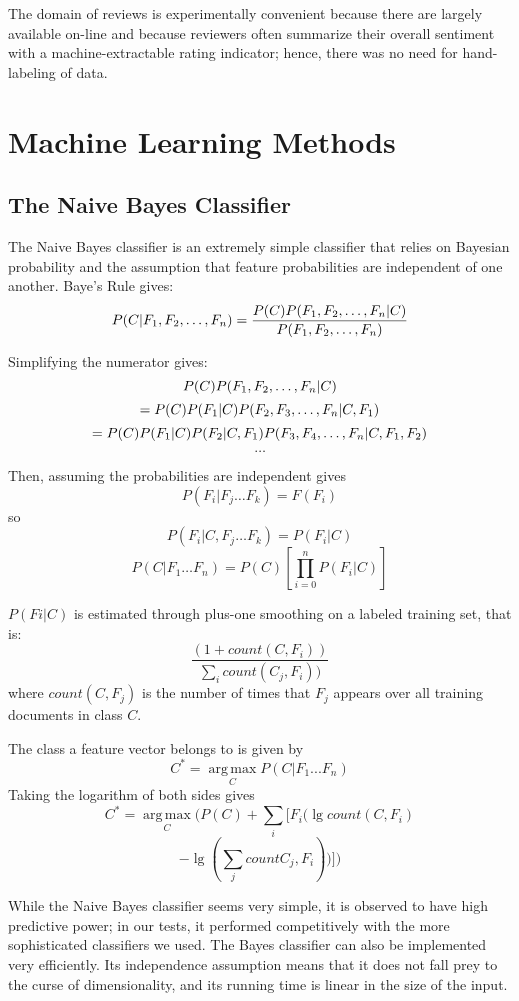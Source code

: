 \documentclass[10pt,twocolumn,letterpaper]{article}
\begin{document}
The domain of reviews is experimentally convenient because there are largely available on-line and because reviewers often summarize their overall sentiment with a machine-extractable rating indicator; hence, there was no need for hand-labeling of data.


\section{Machine Learning Methods}
\subsection{The Naive Bayes Classifier}
The Naive Bayes classifier\cite{Manning} is an extremely simple classifier that relies on Bayesian probability and the assumption that feature probabilities are independent of one another.
Baye's Rule gives:
$$
P(C | F_1, F_2, \ldots, F_n)
= \frac{P(C)P(F_1, F_2, \ldots, F_n | C)}{P(F_1, F_2, \ldots, F_n)} \\
$$

Simplifying the numerator gives:
$$P(C)P(F_1, F_2, \ldots, F_n | C)\\$$
$$= P(C)P(F_1 | C)P( F_2, F_3, \ldots, F_n| C, F_1) \\$$
$$= P(C)P(F_1 | C)P(F_2 | C, F_1)P(F_3, F_4, \ldots, F_n | C, F_1, F_2) \\$$
$$\ldots$$

Then, assuming the probabilities are independent gives
$$P(F_i | F_j\ldots F_k) = F(F_i)$$
so 
$$P(F_i | C, F_j\ldots F_k) = P(F_i | C)$$
$$P(C | F_1\ldots F_n) = P(C) [\prod_{i=0}^n P(F_i | C) ]$$

$P(Fi | C)$ is estimated through plus-one smoothing on a labeled training set, that is:
$$\frac{(1+count(C, F_i))}{\sum_i count(C_j, F_i))}$$
where $count(C, F_j)$ is the number of times that $F_j$ appears over all training documents in class $C$.

The class a feature vector belongs to is given by
$$C^* = \operatorname*{arg\,max}_C P(C | F_1...F_n)$$
Taking the logarithm of both sides gives
$$C^* = \operatorname*{arg\,max}_C (P(C) + \sum_i [F_i (\lg count (C, F_i)$$ 
$$ - \lg (\sum_j count C_j, F_i))])$$

While the Naive Bayes classifier seems very simple, it is observed to have high predictive power; in our tests, it performed competitively with the more sophisticated classifiers we used. The Bayes classifier can also be implemented very efficiently. Its independence assumption means that it does not fall prey to the curse of dimensionality, and its running time is linear in the size of the input.
\end{document}
